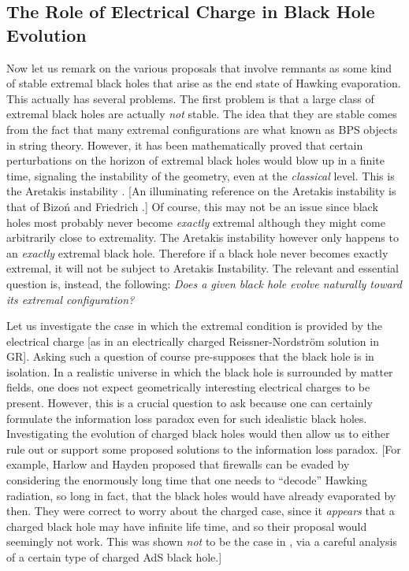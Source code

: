 \documentclass[12pt]{article}
\newcommand{\2}{$^2$}
\newcommand{\3}{$^3$}
\newcommand{\4}{$_4$}
\newcommand{\5}{$_5$}
\begin{document}
\subsection{The Role of Electrical Charge in Black Hole Evolution}\label{concluding remarks}

Now let us remark on the various proposals that involve remnants as some kind of stable extremal black holes that arise as the end state of Hawking evaporation. This actually has several problems. The first problem is that a large class of extremal black holes are actually \emph{not} stable. The idea that they are stable comes from the fact that many extremal configurations are what known as BPS objects in string theory. However, it has been mathematically proved that certain perturbations on the horizon of extremal black holes would blow up in a finite time, signaling the instability of the geometry, even at the \emph{classical} level. This is the Aretakis instability \cite{1110.2006, 1206.6598, 1208.1437, 1307.6800}.  [An illuminating reference on the Aretakis instability is that of Bizo\'n and Friedrich \cite{1212.0729}.] Of course, this may not be an issue since black holes most probably never become \emph{exactly} extremal although they might come arbitrarily close to extremality. The Aretakis instability however only happens to an \emph{exactly} extremal black hole. Therefore if a black hole never becomes exactly extremal, it will not be subject to Aretakis Instability. 
The relevant and essential question is, instead, the following: \emph{Does a given black hole evolve naturally toward its extremal configuration?} 

Let us investigate the case in which the extremal condition is provided by the electrical charge [as in an electrically charged Reissner-Nordstr\"om solution in GR]. 
Asking such a question of course pre-supposes that the black hole is in isolation. In a realistic universe in which the black hole is surrounded by matter fields, one does not expect  geometrically interesting electrical charges to be present. However, this is a crucial question to ask because one can certainly formulate the information loss paradox even for such idealistic black holes. Investigating the evolution of charged black holes would then allow us to either rule out or support some proposed solutions to the information loss paradox. [For example, Harlow and Hayden \cite{HH} proposed that firewalls can be evaded by considering the enormously long time that one needs to ``decode'' Hawking radiation, so long in fact, that the black holes would have already evaporated by then. They were correct to worry about the charged case, since it \emph{appears} that a charged black hole may have infinite life time, and so their proposal would seemingly not work. This was shown \emph{not} to be the case in \cite{OMC}, via a careful analysis of a certain type of charged AdS black hole.]
\end{document}

